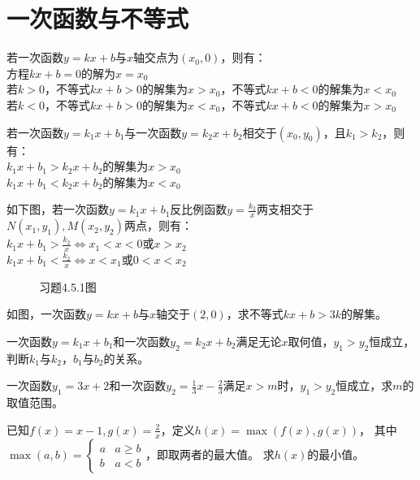 \section{一次函数与不等式}
\begin{theorem}
    若一次函数$y=kx+b$与$x$轴交点为$(x_0,0)$，则有： \\
    方程$kx+b=0$的解为$x=x_0$ \\
    若$k>0$，不等式$kx+b>0$的解集为$x>x_0$，不等式$kx+b<0$的解集为$x<x_0$ \\
    若$k<0$，不等式$kx+b>0$的解集为$x<x_0$，不等式$kx+b<0$的解集为$x>x_0$
\end{theorem}
\begin{theorem}
    若一次函数$y=k_1x+b_1$与一次函数$y=k_2x+b_2$相交于$(x_0,y_0)$，且$k_1>k_2$，则有： \\
    $k_1x+b_1>k_2x+b_2$的解集为$x>x_0$ \\
    $k_1x+b_1<k_2x+b_2$的解集为$x<x_0$
\end{theorem}
\begin{theorem}
    如下图，若一次函数$y=k_1x+b_1$反比例函数$y=\frac{k_2}{x}$两支相交于$N(x_1,y_1),M(x_2,y_2)$两点，则有：\\
    $k_1x+b_1>\frac{k_2}{x} \Leftrightarrow x_1<x<0$或$x>x_2$\\
    $k_1x+b_1<\frac{k_2}{x} \Leftrightarrow x<x_1$或$0<x<x_2$
\end{theorem}
\begin{figure}[ht]
    \centering
    \begin{minipage}[t]{0.48\textwidth}
        \centering
        \resizebox{4cm}{!}{}
        \caption{一次函数与反比例函数}
    \end{minipage}
    \begin{minipage}[t]{0.48\textwidth}
        \centering
        \resizebox{4cm}{!}{}
        \caption{习题4.5.1图}
    \end{minipage}
\end{figure}
\begin{problem}
如图，一次函数$y=kx+b$与$x$轴交于$(2,0)$，求不等式$kx+b>3k$的解集。 \\
\end{problem}
\begin{problem}
一次函数$y=k_1x+b_1$和一次函数$y_2=k_2x+b_2$满足无论$x$取何值，$y_1>y_2$恒成立，判断$k_1$与$k_2$，$b_1$与$b_2$的关系。\\
\end{problem}
\begin{problem}
一次函数$y_1=3x+2$和一次函数$y_2=\frac{1}{3}x-\frac{2}{3}$满足$x>m$时，$y_1>y_2$恒成立，求$m$的取值范围。\\
\end{problem}
\begin{problem}
已知$f(x)=x-1,g(x)=\frac{2}{x}$，定义$h(x)=\max(f(x),g(x))$，
其中$\max(a,b)=\begin{cases} a & \text{$a \ge b$} \\ b & \text {$a<b$}\end{cases}$，即取两者的最大值。
求$h(x)$的最小值。
\end{problem}
\clearpage
